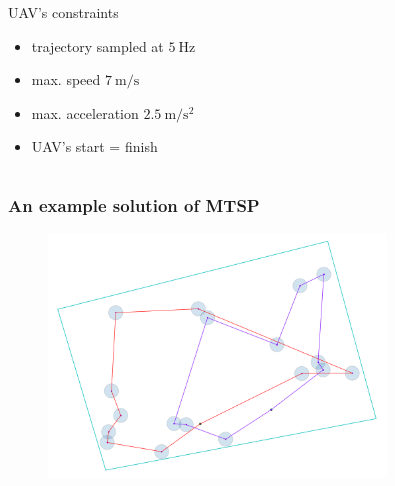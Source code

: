 \documentclass[aspectratio=1610]{beamer}
\newcommand{\unit}[2]{$#1~\ensuremath{\mathrm{#2}}$}
\begin{document}
\begin{frame}
\begin{columns}[c]
      \begin{block}{UAV's constraints}
        \begin{itemize}
          \item trajectory sampled at \unit{5}{Hz}
          \item max. speed \unit{7}{m/s}
          \item max. acceleration \unit{2.5}{m/s^2}
          \item UAV's start = finish
        \end{itemize}
      \end{block}

    \end{columns}

  \end{frame}


  \begin{frame}
    \frametitle{An example solution of MTSP}

    \begin{figure}
      \includegraphics[width=0.8\textwidth]{fig/mtspn_task/tsp_segments_center.png}
    \end{figure}

  \end{frame}
\end{document}
